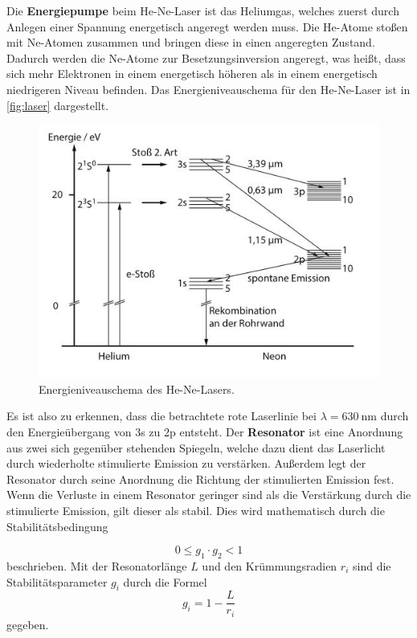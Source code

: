 \noindent
Die \textbf{Energiepumpe} beim He-Ne-Laser ist das Heliumgas, welches zuerst durch Anlegen einer Spannung energetisch angeregt werden muss. Die He-Atome stoßen mit Ne-Atomen zusammen und bringen diese in einen angeregten Zustand. Dadurch werden die Ne-Atome zur Besetzungsinversion angeregt, was heißt, dass sich mehr Elektronen in einem energetisch höheren als in einem energetisch niedrigeren Niveau befinden. Das Energieniveauschema für den He-Ne-Laser ist in \autoref{fig:laser} dargestellt.
\begin{figure}[H]
  \centering
  \includegraphics[width=1\textwidth]{images/niveaus.JPG}
  \caption{Energieniveauschema des He-Ne-Lasers. \cite{laser}}
  \label{fig:laser}
\end{figure}
\noindent
Es ist also zu erkennen, dass die betrachtete rote Laserlinie bei $\lambda = \SI{630}{\nano\metre}$ durch den Energieübergang von 3s zu 2p entsteht.
\newline
\noindent
Der \textbf{Resonator} ist eine Anordnung aus zwei sich gegenüber stehenden Spiegeln, welche dazu dient das Laserlicht durch wiederholte stimulierte Emission zu verstärken. Außerdem legt der Resonator durch seine Anordnung die Richtung der stimulierten Emission fest. Wenn die Verluste in einem Resonator geringer sind als die Verstärkung durch die stimulierte Emission, gilt dieser als stabil. Dies wird mathematisch durch die Stabilitätsbedingung

\begin{equation}
    0 \leq g_1 \cdot g_2 < 1
    \label{eqn:Stabilität}
\end{equation}
\noindent
beschrieben. Mit der Resonatorlänge $L$ und den Krümmungsradien $r_i$ sind die Stabilitätsparameter $g_i$ durch die Formel
\begin{equation}
    g_i = 1 - \frac{L}{r_i}
\end{equation}
\noindent
gegeben.
\newline

